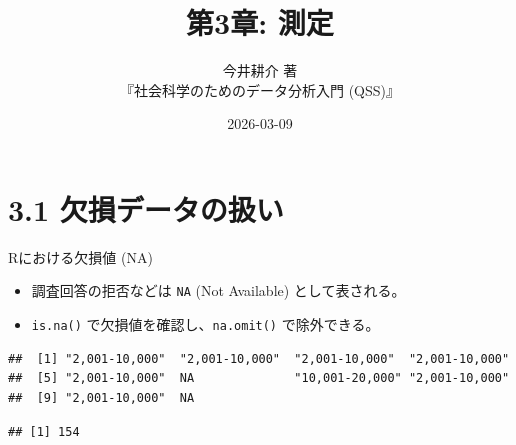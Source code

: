 \documentclass[
  ignorenonframetext,
]{beamer}
\title{第3章: 測定}
\subtitle{今井耕介 著\\
『社会科学のためのデータ分析入門 (QSS)』}
\author{}
\date{\vspace{-2.5em}2026-03-09}
\newenvironment{Shaded}{\begin{snugshade}}{\end{snugshade}}
\newcommand{\AttributeTok}[1]{\textcolor[rgb]{0.77,0.63,0.00}{#1}}
\newcommand{\CommentTok}[1]{\textcolor[rgb]{0.56,0.35,0.01}{\textit{#1}}}
\newcommand{\DecValTok}[1]{\textcolor[rgb]{0.00,0.00,0.81}{#1}}
\newcommand{\FunctionTok}[1]{\textcolor[rgb]{0.00,0.00,0.00}{#1}}
\newcommand{\NormalTok}[1]{#1}
\newcommand{\OtherTok}[1]{\textcolor[rgb]{0.56,0.35,0.01}{#1}}
\newcommand{\SpecialCharTok}[1]{\textcolor[rgb]{0.00,0.00,0.00}{#1}}
\newcommand{\StringTok}[1]{\textcolor[rgb]{0.31,0.60,0.02}{#1}}
\providecommand{\tightlist}{%
  \setlength{\itemsep}{0pt}\setlength{\parskip}{0pt}}
\begin{document}
\frame{\titlepage}

\hypertarget{ux6b20ux640dux30c7ux30fcux30bfux306eux6271ux3044}{%
\section{3.1
欠損データの扱い}\label{ux6b20ux640dux30c7ux30fcux30bfux306eux6271ux3044}}

\begin{frame}[fragile]{Rにおける欠損値 (NA)}
\protect\hypertarget{rux306bux304aux3051ux308bux6b20ux640dux5024-na}{}
\begin{itemize}
\tightlist
\item
  調査回答の拒否などは \texttt{NA} (Not Available) として表される。
\item
  \texttt{is.na()} で欠損値を確認し、\texttt{na.omit()} で除外できる。
\end{itemize}

\begin{Shaded}
\end{Shaded}

\begin{verbatim}
##  [1] "2,001-10,000"  "2,001-10,000"  "2,001-10,000"  "2,001-10,000" 
##  [5] "2,001-10,000"  NA              "10,001-20,000" "2,001-10,000" 
##  [9] "2,001-10,000"  NA
\end{verbatim}

\begin{Shaded}
\end{Shaded}

\begin{verbatim}
## [1] 154
\end{verbatim}

\begin{Shaded}
\end{Shaded}


\end{frame}
\end{document}
